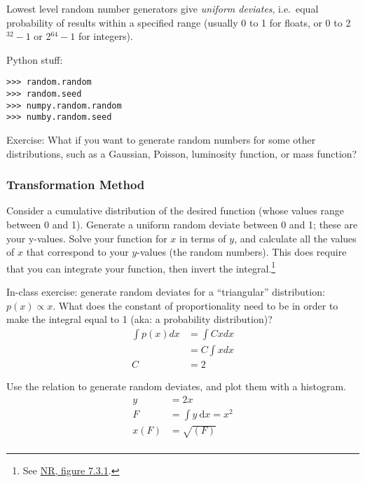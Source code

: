 \documentclass{article}
\begin{document}
Lowest level random number generators give \textit{uniform deviates},
i.e.\ equal probability of results within a specified range
(usually 0 to 1 for floats, or 0 to 2$^{32}-1$ or 2$^{64}-1$ for integers).

Python stuff:
\begin{verbatim}
>>> random.random
>>> random.seed
>>> numpy.random.random
>>> numby.random.seed
\end{verbatim}

\begin{framed}
    Exercise: What if you want to generate random numbers for some other distributions,
    such as a Gaussian, Poisson, luminosity function, or mass function?
\end{framed}

\subsubsection{Transformation Method}
Consider a cumulative distribution of the desired function (whose values range
between 0 and 1). Generate a uniform random deviate between 0 and 1; these
are your y-values. Solve your function for $x$ in terms of $y$, and calculate
all the values of $x$ that correspond to your $y$-values (the random numbers).
This does require that you can integrate your function, then invert
the integral.\footnote{
    See
    \href{http://astronomy.nmsu.edu/holtz/a575/images/NR.html}
    {NR, figure 7.3.1}.
}

\begin{framed}
    In-class exercise: generate random deviates for a ``triangular'' distribution:
    $p(x) \propto x$. What does the constant of proportionality need to be in order
    to make the integral equal to 1 (aka: a probability distribution)?
    \begin{align*}
        \int{p(x) dx} &= \int{Cx dx}\\
        &= C\int{x dx}\\
        C &= 2
    \end{align*}
\end{framed}

Use the relation to generate random deviates, and plot them with a histogram.
\begin{align*}
    y &= 2x \\
    F &= \int \! y \ \mathrm{d}x = x^2\\
    x(F) &= \sqrt{(F)} \\
\end{align*}
\end{document}
